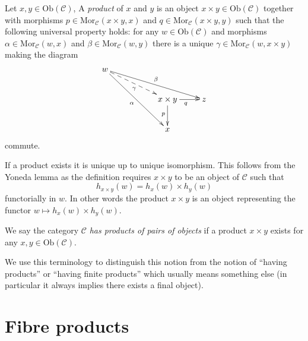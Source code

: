 \begin{definition}
\label{definition-products}
Let $x,y\in \text{Ob}(\mathcal{C})$,
A {\it product} of $x$ and $y$ is
an object $x\times y \in \text{Ob}(\mathcal{C})$
together with morphisms 
$p\in \text{Mor}_{\mathcal C}(x\times y, x)$ and 
$q\in\text{Mor}_{\mathcal C}(x\times y, y)$ such
that the following universal property holds: for
any $w\in \text{Ob}(\mathcal{C})$ and morphisms 
$\alpha \in \text{Mor}_{\mathcal C}(w, x)$ and 
$\beta \in \text{Mor}_{\mathcal{C}}(w, y)$
there is a unique
$\gamma\in \text{Mor}_{\mathcal C}(w, x\times y)$ making
the diagram
$$
\xymatrix{
w \ar[rrrd]^\beta \ar@{-->}[rrd]_\gamma \ar[rrdd]_\alpha
&
&
\\
&
&
x\times y \ar[d]_{p} \ar[r]_{q}
&
z
\\
&
&
x
&
}
$$
commute.
\end{definition}

\noindent
If a product exists it is unique up to unique
isomorphism. This follows from the Yoneda lemma as
the definition requires $x\times y$ to be an object
of $\mathcal{C}$ such that
$$
h_{x\times y}(w) = h_x(w) \times h_y(w)
$$
functorially in $w$. In other words the product $x \times y$
is an object representing the functor
$w \mapsto h_x(w) \times h_y(w)$.

\begin{definition}
\label{definition-has-products-of-pairs}
We say the category $\mathcal{C}$ {\it has products of pairs
of objects} if a product $x \times y$
exists for any $x, y \in \text{Ob}(\mathcal{C})$.
\end{definition}

\noindent
We use this terminology to distinguish this notion from the notion
of ``having products'' or ``having finite products'' which usually means 
something else (in particular it always implies there exists a
final object).





\section{Fibre products}
\label{section-fibre-products}

